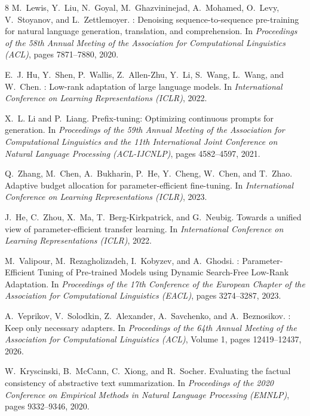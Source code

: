 \documentclass[11pt, letterpaper]{article}
\begin{document}
\begin{thebibliography}{8}
M.~Lewis, Y.~Liu, N.~Goyal, M.~Ghazvininejad, A.~Mohamed, O.~Levy, V.~Stoyanov, and L.~Zettlemoyer.
: Denoising sequence-to-sequence pre-training for natural language generation, translation, and comprehension.
\newblock In \emph{Proceedings of the 58th Annual Meeting of the Association for Computational Linguistics (ACL)}, pages 7871--7880, 2020.

E.~J. Hu, Y.~Shen, P.~Wallis, Z.~Allen-Zhu, Y.~Li, S.~Wang, L.~Wang, and W.~Chen.
: Low-rank adaptation of large language models.
\newblock In \emph{International Conference on Learning Representations (ICLR)}, 2022.

X.~L. Li and P.~Liang.
\newblock Prefix-tuning: Optimizing continuous prompts for generation.
\newblock In \emph{Proceedings of the 59th Annual Meeting of the Association for Computational Linguistics and the 11th International Joint Conference on Natural Language Processing (ACL-IJCNLP)}, pages 4582--4597, 2021.

Q.~Zhang, M.~Chen, A.~Bukharin, P.~He, Y.~Cheng, W.~Chen, and T.~Zhao.
\newblock Adaptive budget allocation for parameter-efficient fine-tuning.
\newblock In \emph{International Conference on Learning Representations (ICLR)}, 2023.

J.~He, C.~Zhou, X.~Ma, T.~Berg-Kirkpatrick, and G.~Neubig.
\newblock Towards a unified view of parameter-efficient transfer learning.
\newblock In \emph{International Conference on Learning Representations (ICLR)}, 2022.

M.~Valipour, M.~Rezagholizadeh, I.~Kobyzev, and A.~Ghodsi.
: Parameter-Efficient Tuning of Pre-trained Models using Dynamic Search-Free Low-Rank Adaptation.
\newblock In \emph{Proceedings of the 17th Conference of the European Chapter of the Association for Computational Linguistics (EACL)}, pages 3274--3287, 2023.

A.~Veprikov, V.~Solodkin, Z.~Alexander, A.~Savchenko, and A.~Beznosikov.
: Keep only necessary adapters.
\newblock In \emph{Proceedings of the 64th Annual Meeting of the Association for Computational Linguistics (ACL)}, Volume 1, pages 12419--12437, 2026.

W.~Kryscinski, B.~McCann, C.~Xiong, and R.~Socher.
\newblock Evaluating the factual consistency of abstractive text summarization.
\newblock In \emph{Proceedings of the 2020 Conference on Empirical Methods in Natural Language Processing (EMNLP)}, pages 9332--9346, 2020.
\end{thebibliography}
\end{document}
